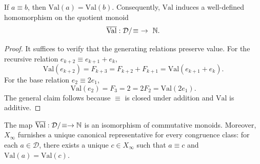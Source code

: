 \begin{proposition}\label{prop:val-invariant}
If \(a\equiv b\), then \(\mathrm{Val}(a)=\mathrm{Val}(b)\). Consequently, \(\mathrm{Val}\) induces a well-defined homomorphism on the quotient monoid
\[
\overline{\mathrm{Val}}:\mathcal{D}/\!\equiv\ \to\ \NN.
\]
\end{proposition}

\begin{proof}
It suffices to verify that the generating relations preserve value. For the recursive relation \(e_{k+2}\equiv e_{k+1}+e_k\),
\[
\mathrm{Val}(e_{k+2})=F_{k+3}=F_{k+2}+F_{k+1}=\mathrm{Val}(e_{k+1}+e_k).
\]
For the base relation \(e_2\equiv 2e_1\),
\[
\mathrm{Val}(e_2)=F_3=2=2F_2=\mathrm{Val}(2e_1).
\]
The general claim follows because \(\equiv\) is closed under addition and \(\mathrm{Val}\) is additive.
\end{proof}

\begin{theorem}\label{thm:monoid-quotient-is-N}
The map \(\overline{\mathrm{Val}}:\mathcal{D}/\!\equiv\to\mathbb{N}\) is an isomorphism of commutative monoids. Moreover, \(X_\infty\) furnishes a unique canonical representative for every congruence class: for each \(a\in\mathcal{D}\), there exists a unique \(c\in X_\infty\) such that \(a\equiv c\) and \(\mathrm{Val}(a)=\mathrm{Val}(c)\).
\end{theorem}


